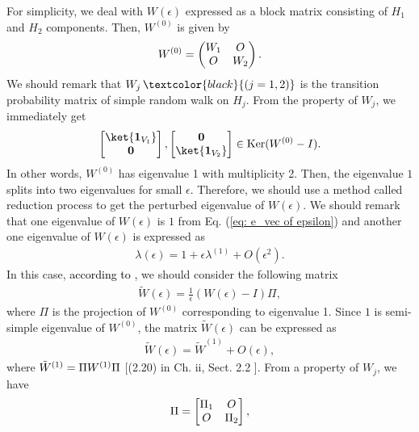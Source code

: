 \documentclass[12pt]{article}
\numberwithin{lemma}{section}
\numberwithin{proposition}{section}
\numberwithin{remark}{section}
\numberwithin{definition}{section}
\newcommand{\red}{\textcolor{black}}
\begin{document}
For simplicity, we deal with $W(\epsilon)$ expressed as a block matrix consisting of $H_1$ and $H_2$ components.
Then, $W^{(0)}$ is given by
\begin{align*}
    W^{(0)}=
    \begin{pmatrix}
        {\huge{W_1}} & {\huge{O}} \\
        {\huge{O}} & {\huge{W_2}}
    \end{pmatrix}.
\end{align*}
We should remark that $W_j \, \red{(j=1,2)}$ is the transition probability matrix of simple random walk on $H_j$. 
From the property of $W_j$, we immediately get
\begin{align*}
    \begin{bmatrix}
        \ket{\boldsymbol{1}_{V_1}} \\
        \boldsymbol{0}
    \end{bmatrix},
    \begin{bmatrix}
        \boldsymbol{0} \\
        \ket{\boldsymbol{1}_{V_2}}
    \end{bmatrix}
    \in \mathrm{Ker}(W^{(0)}-I).
\end{align*}
In other words, $W^{(0)}$ has eigenvalue 1 with multiplicity 2.
Then, the eigenvalue $1$ splits into two eigenvalues for small $\epsilon$.
Therefore, we should use a method called reduction process \cite{Kato} to get the perturbed eigenvalue of $W(\epsilon)$.
We should remark that one eigenvalue of $W(\epsilon)$ is $1$ from Eq. (\ref{eq: e_vec of epsilon}) and another one eigenvalue of $W(\epsilon)$ is expressed as 
\begin{align}\label{eq:expand}    \lambda(\epsilon)=1+\epsilon\lambda^{(1)}+O(\epsilon^2).
\end{align}
In this case, \red{according to \cite{Kato},} we should consider the following matrix
\begin{align*}
    \tilde{W}(\epsilon)=\frac{1}{\epsilon}(W(\epsilon)-I)\Pi,
\end{align*}
where $\Pi$ is the projection of $W^{(0)}$ corresponding to eigenvalue 1.
Since $1$ is semi-simple eigenvalue of $W^{(0)}$, the matrix $\tilde{W}(\epsilon)$ can be expressed as
\begin{align*}
    \tilde{W}(\epsilon)=\tilde{W}^{(1)}+O(\epsilon),
\end{align*}
where $\Tilde{W}^{(1)}=\Pi W^{(1)} \Pi$ [(2.20) in Ch. ii, Sect. 2.2 \cite{Kato}].
From a property of $W_j$, we have
\begin{align*}
    \Pi=
    \begin{bmatrix}
        \Pi_1 & {\huge O} \\
        {\huge O} & \Pi_2
    \end{bmatrix},
\end{align*}
\end{document}
